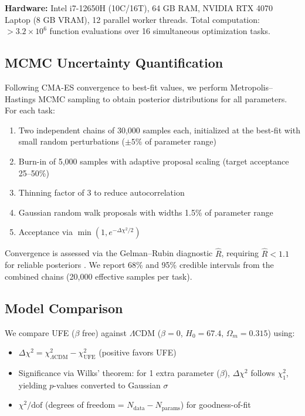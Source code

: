 \documentclass[twocolumn,prd,superscriptaddress,nofootinbib]{revtex4-2}
\begin{document}
\textbf{Hardware:} Intel i7-12650H (10C/16T), 64 GB RAM, NVIDIA RTX 4070 Laptop (8 GB VRAM), 12 parallel worker threads. Total computation: $>3.2 \times 10^6$ function evaluations over 16 simultaneous optimization tasks.

\subsection{MCMC Uncertainty Quantification}

Following CMA-ES convergence to best-fit values, we perform Metropolis--Hastings MCMC sampling to obtain posterior distributions for all parameters. For each task:

\begin{enumerate}
\item Two independent chains of 30,000 samples each, initialized at the best-fit with small random perturbations ($\pm 5\%$ of parameter range)
\item Burn-in of 5,000 samples with adaptive proposal scaling (target acceptance 25--50\%)
\item Thinning factor of 3 to reduce autocorrelation
\item Gaussian random walk proposals with widths 1.5\% of parameter range
\item Acceptance via $\min(1, e^{-\Delta\chi^2/2})$
\end{enumerate}

Convergence is assessed via the Gelman--Rubin diagnostic $\hat{R}$, requiring $\hat{R} < 1.1$ for reliable posteriors \cite{Gelman1992}. We report 68\% and 95\% credible intervals from the combined chains (20,000 effective samples per task).

\subsection{Model Comparison}

We compare UFE ($\beta$ free) against $\Lambda$CDM ($\beta = 0$, $H_0 = 67.4$, $\Omega_m = 0.315$) using:
\begin{itemize}
\item $\Delta\chi^2 = \chi^2_{\Lambda\text{CDM}} - \chi^2_\text{UFE}$ (positive favors UFE)
\item Significance via Wilks' theorem: for 1 extra parameter ($\beta$), $\Delta\chi^2$ follows $\chi^2_1$, yielding $p$-values converted to Gaussian $\sigma$
\item $\chi^2/\text{dof}$ (degrees of freedom = $N_\text{data} - N_\text{params}$) for goodness-of-fit
\end{itemize}
\end{document}

